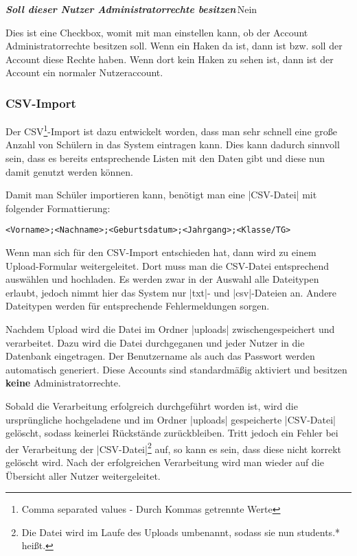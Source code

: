 \documentclass[ngerman]{ltxdoc}
\newcommand{\DescribeOption}[4]{
  \DescribeMacro{#1}
  \begin{minipage}[t]{\textwidth}
    \textit{\textbf{\textcolor{mLightGreen}{#2}}}\dotfill\,#3\par
    \begingroup
    \vspace{0.5em}#4\par
    \endgroup
  \end{minipage}
}
\begin{document}
\DescribeOption{Administrator}{Soll dieser Nutzer Administratorrechte besitzen}{Nein}{
  Dies ist eine Checkbox, womit mit man einstellen kann, ob der Account
  Administratorrechte besitzen soll. Wenn ein Haken da ist, dann ist bzw.
  soll der Account diese Rechte haben. Wenn dort kein Haken zu sehen ist, dann ist der
  Account ein normaler Nutzeraccount.
}

\subsubsection{CSV-Import}

Der CSV\footnote{Comma separated values - Durch Kommas getrennte Werte}-Import ist dazu entwickelt worden, dass man sehr schnell eine große
Anzahl von Schülern in das System eintragen kann. Dies kann dadurch sinnvoll sein,
dass es bereits entsprechende Listen mit den Daten gibt und diese nun damit
genutzt werden können.

Damit man Schüler importieren kann, benötigt man eine |CSV-Datei| mit folgender
Formattierung:

\begin{lstlisting}[style=tex]
<Vorname>;<Nachname>;<Geburtsdatum>;<Jahrgang>;<Klasse/TG>
\end{lstlisting}

Wenn man sich für den CSV-Import entschieden hat, dann wird zu einem Upload-Formular
weitergeleitet. Dort muss man die CSV-Datei entsprechend auswählen und hochladen.
Es werden zwar in der Auswahl alle Dateitypen erlaubt, jedoch nimmt hier das
System nur |txt|- und |csv|-Dateien an. Andere Dateitypen werden für entsprechende
Fehlermeldungen sorgen.

Nachdem Upload wird die Datei im Ordner |uploads| zwischengespeichert und verarbeitet.
Dazu wird die Datei durchgeganen und jeder Nutzer in die Datenbank eingetragen.
Der Benutzername als auch das Passwort werden automatisch generiert. Diese
Accounts sind standardmäßig aktiviert und besitzen \textbf{keine} Administratorrechte.

Sobald die Verarbeitung erfolgreich durchgeführt worden ist, wird die ursprüngliche
hochgeladene und im Ordner |uploads| gespeicherte |CSV-Datei| gelöscht, sodass
keinerlei Rückstände zurückbleiben. Tritt jedoch ein Fehler bei der Verarbeitung
der |CSV-Datei|\footnote{Die Datei wird im Laufe des Uploads umbenannt, sodass sie nun \glqq students.*\grqq{} heißt.}
auf, so kann es sein, dass diese nicht korrekt gelöscht wird. Nach der erfolgreichen
Verarbeitung wird man wieder auf die Übersicht aller Nutzer weitergeleitet.
\end{document}
